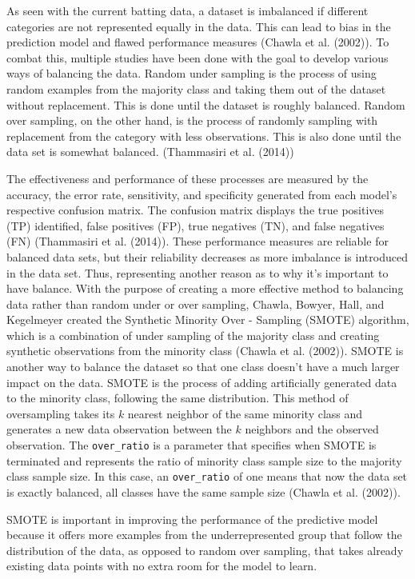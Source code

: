 \documentclass[
  letterpaper,
  DIV=11,
  numbers=noendperiod]{scrartcl}
\begin{document}
As seen with the current batting data, a dataset is imbalanced if
different categories are not represented equally in the data. This can
lead to bias in the prediction model and flawed performance measures
(Chawla et al. (2002)). To combat this, multiple studies have been done
with the goal to develop various ways of balancing the data. Random
under sampling is the process of using random examples from the majority
class and taking them out of the dataset without replacement. This is
done until the dataset is roughly balanced. Random over sampling, on the
other hand, is the process of randomly sampling with replacement from
the category with less observations. This is also done until the data
set is somewhat balanced. (Thammasiri et al. (2014))

The effectiveness and performance of these processes are measured by the
accuracy, the error rate, sensitivity, and specificity generated from
each model's respective confusion matrix. The confusion matrix displays
the true positives (TP) identified, false positives (FP), true negatives
(TN), and false negatives (FN) (Thammasiri et al. (2014)). These
performance measures are reliable for balanced data sets, but their
reliability decreases as more imbalance is introduced in the data set.
Thus, representing another reason as to why it's important to have
balance. With the purpose of creating a more effective method to
balancing data rather than random under or over sampling, Chawla,
Bowyer, Hall, and Kegelmeyer created the Synthetic Minority Over -
Sampling (SMOTE) algorithm, which is a combination of under sampling of
the majority class and creating synthetic observations from the minority
class (Chawla et al. (2002)). SMOTE is another way to balance the
dataset so that one class doesn't have a much larger impact on the data.
SMOTE is the process of adding artificially generated data to the
minority class, following the same distribution. This method of
oversampling takes its \(k\) nearest neighbor of the same minority class
and generates a new data observation between the \(k\) neighbors and the
observed observation. The \texttt{over\_ratio} is a parameter that
specifies when SMOTE is terminated and represents the ratio of minority
class sample size to the majority class sample size. In this case, an
\texttt{over\_ratio} of one means that now the data set is exactly
balanced, all classes have the same sample size (Chawla et al. (2002)).

SMOTE is important in improving the performance of the predictive model
because it offers more examples from the underrepresented group that
follow the distribution of the data, as opposed to random over sampling,
that takes already existing data points with no extra room for the model
to learn.
\end{document}
